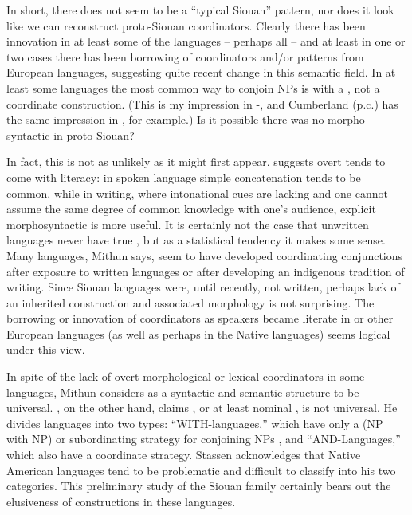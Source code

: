 \documentclass[output=paper]{LSP/langsci}
\begin{document}
In short, there does not seem to be a ``typical Siouan''  pattern, nor does it look like we can reconstruct proto-Siouan coordinators. Clearly there has been innovation in at least some of the languages -- perhaps all -- and at least in one or two cases there has been borrowing of coordinators and/or  patterns from European languages, suggesting quite recent change in this semantic field. In at least some languages the most common way to conjoin NPs is with a , not a coordinate construction. (This is my impression in -, and Cumberland (p.c.) has the same impression in , for example.) Is it possible there was no morpho-syntactic  in proto-Siouan?

In fact, this is not as unlikely as it might first appear. \citet{Mithun1988} suggests overt  tends to come with literacy: in spoken language simple concatenation tends to be common, while in writing, where intonational cues are lacking and one cannot assume the same degree of common knowledge with one's audience, explicit morphosyntactic  is more useful. It is certainly not the case that unwritten languages never have true , but as a statistical tendency it makes some sense. Many languages, Mithun says, seem to have developed coordinating conjunctions after exposure to written languages or after developing an indigenous tradition of writing. Since Siouan languages were, until recently, not written, perhaps lack of an inherited  construction and associated morphology is not surprising. The borrowing or innovation of coordinators as speakers became literate in  or other European languages (as well as perhaps in the Native languages) seems logical under this view.

In spite of the lack of overt morphological or lexical coordinators in some languages, Mithun considers  as a syntactic and semantic structure to be universal. \citet{Stassen2000}, on the other hand, claims , or at least nominal , is not universal. He divides languages into two types: ``WITH-languages,'' which have only a  (NP with NP) or subordinating strategy for conjoining NPs , and ``AND-Languages,'' which also have a coordinate strategy. Stassen acknowledges that Native American languages tend to be problematic and difficult to classify into his two categories. This preliminary study of the Siouan family certainly bears out the elusiveness of  constructions in these languages.
\end{document}
